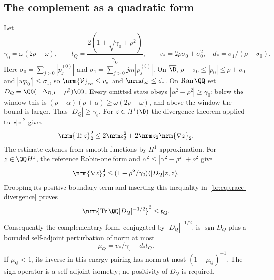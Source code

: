 \subsection{The complement as a quadratic form}\label{br:sec:complement}
Let
\begin{equation}\label{br:eq:complement-constants}
 \gamma_0=\omega(2\rho-\omega),\qquad
 t_Q=\frac{2(1+\sqrt{\gamma_0+\rho^2})}{\gamma_0},\qquad
 v_*=2\rho\sigma_0+\sigma_0^2,\quad d_*=\sigma_1/(\rho-\sigma_0).
\end{equation}
Here $\sigma_0=\sum_{j>0}|p_j^{(0)}|$ and
$\sigma_1=\sum_{j>0}jm|p_j^{(0)}|$. On $\overline\D$,
$\rho-\sigma_0\le|p_0|\le\rho+\sigma_0$ and
$|wp_0'|\le\sigma_1$, so $\nrm{\mathcal V}_\infty\le v_*$ and
$\nrm d_\infty\le d_*$.
On $\operatorname{Ran}\QQ$ set
$D_Q=\QQ(-\Delta_{R,1}-\rho^2)\QQ$. Every omitted state obeys
$|\alpha^2-\rho^2|\ge\gamma_0$: below the window this is
$(\rho-\alpha)(\rho+\alpha)\ge\omega(2\rho-\omega)$, and above the window
the bound is larger. Thus $|D_Q|\ge\gamma_0$.
For $z\in H^1(\D)$ the divergence theorem applied to $x|z|^2$ gives
\begin{equation}\label{br:eq:trace-divergence}
 \nrm{\operatorname{Tr}z}_2^2
 \le2\nrm z_2^2+2\nrm z_2\nrm{\nabla z}_2.
\end{equation}
The estimate extends from smooth functions by $H^1$ approximation.
For $z\in\QQ H^1$, the reference Robin-one form and
$\alpha^2\le|\alpha^2-\rho^2|+\rho^2$ give
\[
 \nrm{\nabla z}_2^2\le
 (1+\rho^2/\gamma_0)\langle|D_Q|z,z\rangle.
\]
Dropping its positive boundary term and inserting this inequality
in~\eqref{br:eq:trace-divergence} proves
\begin{equation}\label{br:eq:trace-energy}
 \nrm{\operatorname{Tr}\QQ|D_Q|^{-1/2}}^2\le t_Q.
\end{equation}
Consequently the complementary form, conjugated by $|D_Q|^{-1/2}$,
is $\operatorname{sgn}D_Q$ plus a bounded self-adjoint perturbation of norm
at most
\begin{equation}\label{br:eq:mu}
 \mu_Q=v_*/\gamma_0+d_*t_Q.
\end{equation}
If $\mu_Q<1$, its inverse in this energy pairing has norm at most
$(1-\mu_Q)^{-1}$. The sign operator is a self-adjoint isometry;
no positivity of $D_Q$ is required.

